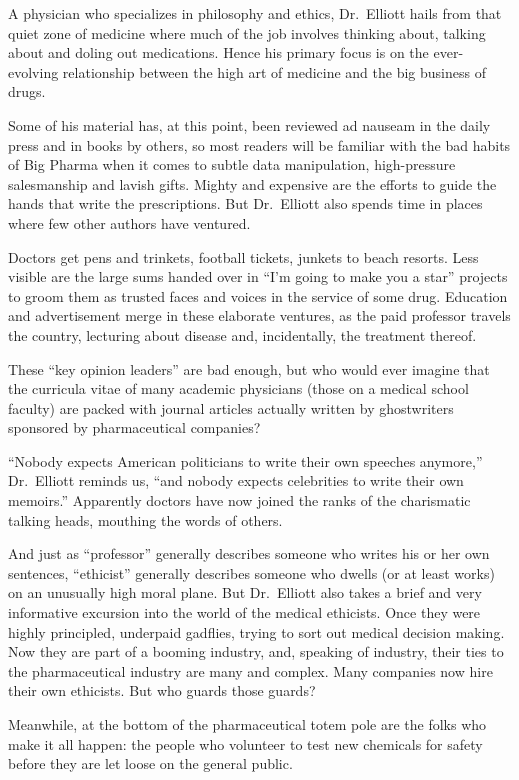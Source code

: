 ﻿\documentclass[12pt]{article}
\begin{document}
A physician who specializes in philosophy and ethics, Dr.~Elliott hails from that quiet zone of
medicine where much of the job involves thinking about, talking about and doling out medications.
Hence his primary focus is on the ever-evolving relationship between the high art of medicine and
the big business of drugs.

Some of his material has, at this point, been reviewed ad nauseam in the daily press and in books by
others, so most readers will be familiar with the bad habits of Big Pharma when it comes to subtle
data manipulation, high-pressure salesmanship and lavish gifts. Mighty and expensive are the efforts
to guide the hands that write the prescriptions. But Dr.~Elliott also spends time in places where
few other authors have ventured.

Doctors get pens and trinkets, football tickets, junkets to beach resorts. Less visible are the
large sums handed over in ``I'm going to make you a star'' projects to groom them as trusted faces
and voices in the service of some drug. Education and advertisement merge in these elaborate
ventures, as the paid professor travels the country, lecturing about disease and, incidentally, the
treatment thereof.

These ``key opinion leaders'' are bad enough, but who would ever imagine that the curricula vitae of
many academic physicians (those on a medical school faculty) are packed with journal articles
actually written by ghostwriters sponsored by pharmaceutical companies?

``Nobody expects American politicians to write their own speeches anymore,'' Dr.~Elliott reminds us,
``and nobody expects celebrities to write their own memoirs.'' Apparently doctors have now joined
the ranks of the charismatic talking heads, mouthing the words of others.

And just as ``professor'' generally describes someone who writes his or her own sentences,
``ethicist'' generally describes someone who dwells (or at least works) on an unusually high moral
plane. But Dr.~Elliott also takes a brief and very informative excursion into the world of the
medical ethicists. Once they were highly principled, underpaid gadflies, trying to sort out medical
decision making. Now they are part of a booming industry, and, speaking of industry, their ties to
the pharmaceutical industry are many and complex. Many companies now hire their own ethicists. But
who guards those guards?

Meanwhile, at the bottom of the pharmaceutical totem pole are the folks who make it all happen: the
people who volunteer to test new chemicals for safety before they are let loose on the general
public.
\end{document}

